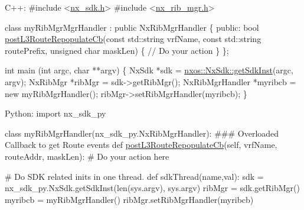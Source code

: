 \begin{DoxyCode}
C++:
\textcolor{preprocessor}{   #include <\mbox{\hyperlink{nx__sdk_8h}{nx\_sdk.h}}>}
\textcolor{preprocessor}{   #include <\mbox{\hyperlink{nx__rib__mgr_8h}{nx\_rib\_mgr.h}}>}

   \textcolor{keyword}{class }myRibMgrMgrHandler : \textcolor{keyword}{public} NxRibMgrHandler \{
      \textcolor{keyword}{public}:
         \textcolor{keywordtype}{bool} \mbox{\hyperlink{classnxos_1_1_nx_rib_mgr_handler_ac3b189923604f553505b0741b8acd39d}{postL3RouteRepopulateCb}}(\textcolor{keyword}{const} std::string vrfName,
                                      \textcolor{keyword}{const} std::string routePrefix,
                                      \textcolor{keywordtype}{unsigned} \textcolor{keywordtype}{char}     maskLen) \{
              \textcolor{comment}{// Do your action}
         \}
   \};

   \textcolor{keywordtype}{int}  main (\textcolor{keywordtype}{int} argc, \textcolor{keywordtype}{char} **argv)
   \{
        NxSdk    *sdk = \mbox{\hyperlink{classnxos_1_1_nx_sdk_a5050e2d26c40744b4fc7862068a83f39}{nxos::NxSdk::getSdkInst}}(argc, argv);
        NxRibMgr *ribMgr = sdk->getRibMgr();
        NxRibMgrHandler *myribcb = \textcolor{keyword}{new} myRibMgrHandler();
        ribMgr->setRibMgrHandler(myribcb);
   \}

Python:
   \textcolor{keyword}{import} nx\_sdk\_py

   \textcolor{keyword}{class }myRibMgrHandler(nx\_sdk\_py.NxRibMgrHandler):
\textcolor{preprocessor}{   ### Overloaded Callback to get Route events}
         def \mbox{\hyperlink{classnxos_1_1_nx_rib_mgr_handler_ac3b189923604f553505b0741b8acd39d}{postL3RouteRepopulateCb}}(self, vrfName, routeAddr, maskLen):
\textcolor{preprocessor}{             # Do your action here}

\textcolor{preprocessor}{   # Do SDK related inits in one thread.}
   def sdkThread(name,val):
       sdk = nx\_sdk\_py.NxSdk.getSdkInst(len(sys.argv), sys.argv)
       ribMgr = sdk.getRibMgr()
       myribcb = myRibMgrHandler()
       ribMgr.setRibMgrHandler(myribcb)
\end{DoxyCode}
 \mbox{\label{classnxos_1_1_nx_rib_mgr_handler_af4214a821d17a84b4746b0dd94b5d58b}} 
